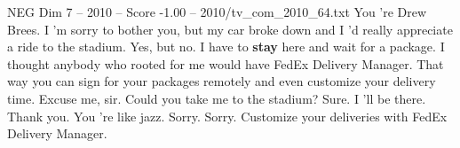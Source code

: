 \begin{textsample}{NEG Dim 7 – 2010 – Score -1.00 – 2010/tv\_com\_2010\_64.txt}  \label{ex:f7_neg_023}
You 're Drew Brees.
I 'm sorry to bother you, but my car broke down and I 'd really appreciate a ride to the stadium.
Yes, but no.
I have to \textbf{stay} here and wait for a package.
I thought anybody who rooted for me would have FedEx Delivery Manager.
That way you can sign for your packages remotely and even customize your delivery time.
Excuse me, sir.
Could you take me to the stadium?
Sure.
I 'll be there.
Thank you.
You 're like jazz.
Sorry.
Sorry.
Customize your deliveries with FedEx Delivery Manager.

\end{textsample}
